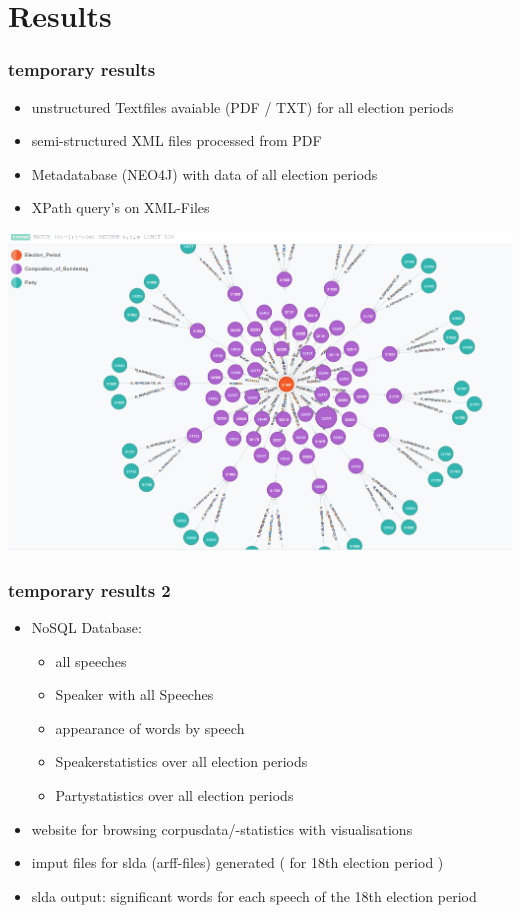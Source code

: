 \documentclass[11pt, a4paper]{beamer}
\begin{document}
\section{Results}
\begin{frame}
\frametitle{temporary results}
\begin{itemize}
\item unstructured Textfiles avaiable (PDF / TXT) for all election periods
\item semi-structured XML files processed from PDF
\item Metadatabase (NEO4J) with data of all election periods
\item XPath query's on XML-Files
\end{itemize}
\includegraphics[scale=0.25]{metadatabase.png}
\end{frame}

\begin{frame}
\frametitle{temporary results 2}
\begin{itemize}
\item NoSQL Database:
	\begin{itemize}
		\item all speeches
		\item Speaker with all Speeches
		\item appearance of words by speech
		\item Speakerstatistics over all election periods
		\item Partystatistics over all election periods
	\end{itemize}
\item website for browsing corpusdata/-statistics with visualisations
\item imput files for slda (arff-files) generated ( for 18th election period )
\item slda output: significant words for each speech of the 18th election period 
\end{itemize}
\end{frame}
\end{document}
